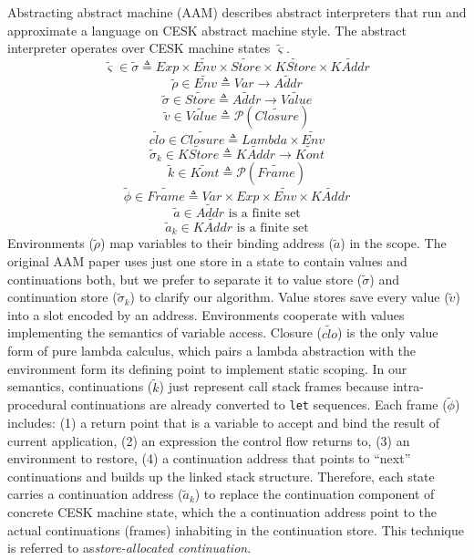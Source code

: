 \documentclass{article}
\begin{document}
Abstracting abstract machine (AAM) describes abstract interpreters that run and approximate a language on CESK abstract machine style.
The abstract interpreter operates over CESK machine states $\tilde{\varsigma}$.
\[
\tag{states}
\tilde{\varsigma}\in\tilde{\sigma} \triangleq Exp \times \widetilde{Env} \times \widetilde{Store}
\times \widetilde{KStore} \times \widetilde{KAddr}
\]
\[
\tag{environments}
\tilde{\rho} \in \widetilde{Env} \triangleq Var \to \widetilde{Addr}
\]
\[
\tag{stores}
\tilde{\sigma} \in \widetilde{Store} \triangleq \widetilde{Addr} \to \widetilde{Value}
\]
\[
\tag{abstract values}
\tilde{v} \in \widetilde{Value} \triangleq \mathcal{P}(\widetilde{Closure})
\]
\[
\tag{closures}
\widetilde{clo} \in \widetilde{Closure} \triangleq Lambda \times \widetilde{Env}
\]
\[
\tag{continuation stores}
\tilde{\sigma}_k \in \widetilde{KStore} \triangleq  \widetilde{KAddr} \to  \widetilde{Kont}
\]
\[
\tag{abstract continuations}
\widetilde{k} \in  \widetilde{Kont} \triangleq  \mathcal{P}(\widetilde{Frame})
\]
\[
\tag{stack frames}
\widetilde{\phi} \in  \widetilde{Frame} \triangleq Var \times Exp \times  \widetilde{Env} \times  \widetilde{KAddr}
\]
\[
\tag{value addresses}
\tilde{a} \in \widetilde{Addr} \mbox{ is a finite set}
\]
\[
\tag{continuation addresses}
\tilde{a}_k \in \widetilde{KAddr} \mbox{ is a finite set}
\]
Environments ($\tilde{\rho}$) map variables to their binding address ($\tilde{a}$) in the scope.
The original AAM paper uses just one store in a state to contain values and continuations both, but we prefer to separate it to value store ($\tilde{\sigma}$) and continuation store ($\tilde{\sigma}_k$) to clarify our algorithm.
Value stores save every value ($\tilde{v}$) into a slot encoded by an address. Environments cooperate with values implementing the semantics of variable access.
Closure ($\widetilde{clo}$) is the only value form of pure lambda calculus, which pairs a lambda abstraction with the environment form its defining point to implement static scoping.
In our semantics, continuations ($\widetilde{k}$) just represent call stack frames because intra-procedural continuations are already converted to \verb|let| sequences.
Each frame ($\widetilde{\phi}$) includes:
(1) a return point that is a variable to accept and bind the result of current application,
(2) an expression the control flow returns to,
(3) an environment to restore,
(4) a continuation address that points to ``next'' continuations and builds up the linked stack structure.
Therefore, each state carries a continuation address ($\tilde{a}_k$) to replace the continuation component of concrete CESK machine state, which the a continuation address point to the actual continuations (frames) inhabiting in the continuation store.
This technique is referred to as\emph{store-allocated continuation}.
\end{document}
